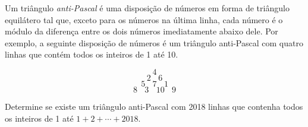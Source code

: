 Um triângulo \textit{anti-Pascal} é uma disposição de números em forma de triângulo equilátero tal que, exceto para os números na última linha, cada número é o módulo da diferença entre os dois números imediatamente abaixo dele. Por exemplo, a seguinte disposição de números é um triângulo anti-Pascal com quatro linhas que contém todos os inteiros de 1 até 10.

$$4$$%
$$2\ \ \ \ 6$$%
$$5\ \ \ \ 7\ \ \ \ 1$$%
$$8\ \ \ \ 3\ \ \ \ 10\ \ \ \ 9$$%

Determine se existe um triângulo anti-Pascal com 2018 linhas que contenha todos os inteiros de 1 até $1 + 2 + \cdots + 2018$.
